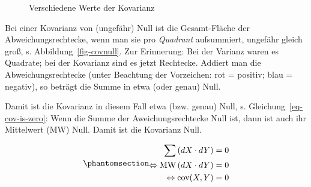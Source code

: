 \documentclass[
  a4paper,
]{scrbook}
\theoremstyle{definition}
\theoremstyle{definition}
\theoremstyle{definition}
\theoremstyle{remark}
\begin{document}
\begin{figure}
\begin{minipage}{0.33\linewidth}


\end{minipage}%

\caption{\label{fig-demos-cov}Verschiedene Werte der Kovarianz}

\end{figure}%

Bei einer Kovarianz von (ungefähr) Null ist die Gesamt-Fläche der
Abweichungsrechtecke, wenn man sie pro \emph{Quadrant} aufsummiert,
ungefähr gleich groß, s. Abbildung~\ref{fig-covnull}. Zur Erinnerung:
Bei der Varianz waren es Quadrate; bei der Kovarianz sind es jetzt
Rechtecke. Addiert man die Abweichungsrechtecke (unter Beachtung der
Vorzeichen: rot = positiv; blau = negativ), so beträgt die Summe in etwa
(oder genau) Null.

Damit ist die Kovarianz in diesem Fall etwa (bzw. genau) Null, s.
Gleichung~\ref{eq-cov-is-zero}: Wenn die Summe der Aweichungsrechtecke
Null ist, dann ist auch ihr Mittelwert (MW) Null. Damit ist die
Kovarianz Null.

\begin{equation}\phantomsection\label{eq-cov-is-zero}{\begin{aligned}
\sum \left(dX \cdot dY \right) &= 0\\
\Leftrightarrow \text{MW} \left(dX \cdot dY \right) &= 0\\
\Leftrightarrow \text{cov}(X, Y) &= 0
\end{aligned}}\end{equation}
\end{document}
